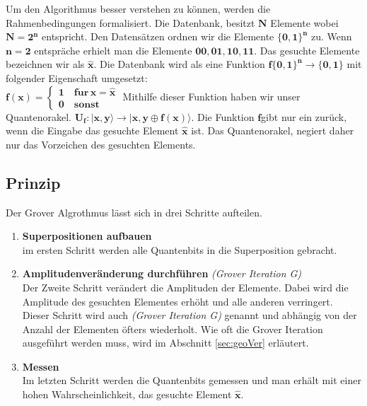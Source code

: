 Um den Algorithmus besser verstehen zu können, werden die Rahmenbedingungen formalisiert. Die Datenbank, besitzt $\mathbf{N}$ Elemente wobei  $\mathbf{N = 2^n}$ entspricht. Den Datensätzen ordnen wir die Elemente $\mathbf{ \{ 0,1 \}^n}$ zu. Wenn $\mathbf{ n=2}$ entspräche erhielt man die Elemente $\mathbf{00,01,10,11}$. Das gesuchte Elemente bezeichnen wir als  $\mathbf{\hat{x}}$. Die Datenbank wird als eine Funktion $\mathbf{f \{ 0,1 \}^n  \rightarrow \{ 0,1 \}}$ mit folgender Eigenschaft umgesetzt: \\
$\mathbf{f(x) = \begin{cases}1 \quad f\ddot{u}r \,
		x = \hat x \\0 \quad sonst \end{cases} 
}$ 
\newline
Mithilfe dieser Funktion haben wir unser Quantenorakel. $\mathbf{U_f : | x,y \rangle \to |x,y \oplus f(x) \rangle}$. Die Funktion $\mathbf{f}$gibt nur ein zurück, wenn die Eingabe das gesuchte Element $\mathbf{\hat x}$ ist. Das Quantenorakel, negiert daher nur das Vorzeichen des gesuchten Elements. 

\subsection{Prinzip}
Der Grover Algrothmus lässt sich in drei Schritte aufteilen.
\begin{enumerate}
	\item \textbf{Superpositionen aufbauen}
	\\
	im ersten Schritt werden alle Quantenbits in die Superposition gebracht.
	\item \textbf{Amplitudenveränderung durchführen} \emph{(Grover Iteration G)}
	\\
	Der Zweite Schritt verändert die Amplituden der Elemente. Dabei wird die Amplitude des gesuchten Elementes erhöht und alle anderen verringert. Dieser Schritt wird auch \emph{(Grover Iteration G)} genannt und abhängig von der Anzahl der Elementen öfters wiederholt. Wie oft die Grover Iteration ausgeführt werden muss, wird im Abschnitt \ref{sec:geoVer} erläutert.
	\item \textbf{Messen} 
	\\
	Im letzten Schritt werden die Quantenbits gemessen und man erhält mit einer hohen Wahrscheinlichkeit, das gesuchte Element $\mathbf{\hat x}$.
\end{enumerate}

